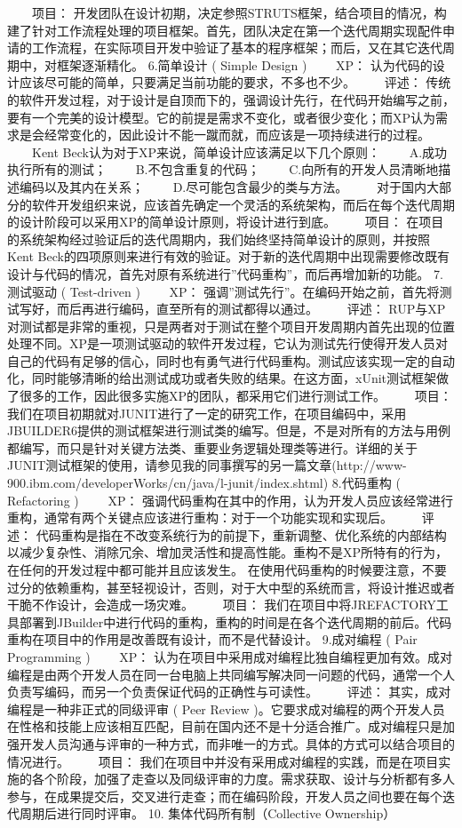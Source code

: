 \documentclass[UTF8]{article}
\begin{document}
　　项目： 开发团队在设计初期，决定参照STRUTS框架，结合项目的情况，构建了针对工作流程处理的项目框架。首先，团队决定在第一个迭代周期实现配件申请的工作流程，在实际项目开发中验证了基本的程序框架；而后，又在其它迭代周期中，对框架逐渐精化。
6.简单设计 ( Simple Design )
　　XP： 认为代码的设计应该尽可能的简单，只要满足当前功能的要求，不多也不少。
　　评述： 传统的软件开发过程，对于设计是自顶而下的，强调设计先行，在代码开始编写之前，要有一个完美的设计模型。它的前提是需求不变化，或者很少变化；而XP认为需求是会经常变化的，因此设计不能一蹴而就，而应该是一项持续进行的过程。
　　Kent Beck认为对于XP来说，简单设计应该满足以下几个原则：
　　A.成功执行所有的测试；
　　B.不包含重复的代码；
　　C.向所有的开发人员清晰地描述编码以及其内在关系；
　　D.尽可能包含最少的类与方法。
　　对于国内大部分的软件开发组织来说，应该首先确定一个灵活的系统架构，而后在每个迭代周期的设计阶段可以采用XP的简单设计原则，将设计进行到底。
　　项目： 在项目的系统架构经过验证后的迭代周期内，我们始终坚持简单设计的原则，并按照Kent Beck的四项原则来进行有效的验证。对于新的迭代周期中出现需要修改既有设计与代码的情况，首先对原有系统进行”代码重构”，而后再增加新的功能。
7.测试驱动 ( Test-driven )
　　XP： 强调”测试先行”。在编码开始之前，首先将测试写好，而后再进行编码，直至所有的测试都得以通过。
　　评述： RUP与XP对测试都是非常的重视，只是两者对于测试在整个项目开发周期内首先出现的位置处理不同。XP是一项测试驱动的软件开发过程，它认为测试先行使得开发人员对自己的代码有足够的信心，同时也有勇气进行代码重构。测试应该实现一定的自动化，同时能够清晰的给出测试成功或者失败的结果。在这方面，xUnit测试框架做了很多的工作，因此很多实施XP的团队，都采用它们进行测试工作。
　　项目： 我们在项目初期就对JUNIT进行了一定的研究工作，在项目编码中，采用JBUILDER6提供的测试框架进行测试类的编写。但是，不是对所有的方法与用例都编写，而只是针对关键方法类、重要业务逻辑处理类等进行。详细的关于JUNIT测试框架的使用，请参见我的同事撰写的另一篇文章(http://www-900.ibm.com/developerWorks/cn/java/l-junit/index.shtml)
8.代码重构 ( Refactoring )
　　XP： 强调代码重构在其中的作用，认为开发人员应该经常进行重构，通常有两个关键点应该进行重构：对于一个功能实现和实现后。
　　评述： 代码重构是指在不改变系统行为的前提下，重新调整、优化系统的内部结构以减少复杂性、消除冗余、增加灵活性和提高性能。重构不是XP所特有的行为，在任何的开发过程中都可能并且应该发生。
在使用代码重构的时候要注意，不要过分的依赖重构，甚至轻视设计，否则，对于大中型的系统而言，将设计推迟或者干脆不作设计，会造成一场灾难。
　　项目： 我们在项目中将JREFACTORY工具部署到JBuilder中进行代码的重构，重构的时间是在各个迭代周期的前后。代码重构在项目中的作用是改善既有设计，而不是代替设计。
9.成对编程 ( Pair Programming )
　　XP： 认为在项目中采用成对编程比独自编程更加有效。成对编程是由两个开发人员在同一台电脑上共同编写解决同一问题的代码，通常一个人负责写编码，而另一个负责保证代码的正确性与可读性。
　　评述： 其实，成对编程是一种非正式的同级评审 ( Peer Review )。它要求成对编程的两个开发人员在性格和技能上应该相互匹配，目前在国内还不是十分适合推广。成对编程只是加强开发人员沟通与评审的一种方式，而非唯一的方式。具体的方式可以结合项目的情况进行。
　　项目： 我们在项目中并没有采用成对编程的实践，而是在项目实施的各个阶段，加强了走查以及同级评审的力度。需求获取、设计与分析都有多人参与，在成果提交后，交叉进行走查；而在编码阶段，开发人员之间也要在每个迭代周期后进行同时评审。
10. 集体代码所有制（Collective Ownership）
\end{document}
